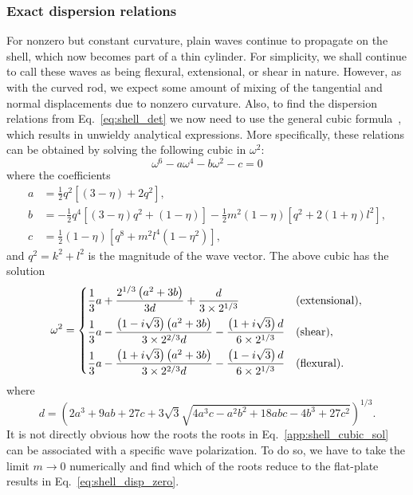 \subsubsection*{Exact dispersion relations}

For nonzero but constant curvature, plain waves continue to propagate on the shell, which now becomes part of a thin cylinder.
For simplicity, we shall continue to call these waves as being flexural, extensional, or shear in nature.
However, as with the curved rod, we expect some amount of mixing of the tangential and normal displacements due to nonzero curvature.
Also, to find the dispersion relations from Eq.~\eqref{eq:shell_det} we now need to use the general cubic formula~\cite{olver2010}, which results in unwieldy analytical expressions.
More specifically, these relations can be obtained by solving the following cubic in $\omega^{2}$:
%
\begin{equation}
  \omega^{6} - a\omega^{4} - b\omega^{2} - c = 0
\end{equation}
%
where the coefficients
%
\begin{equation}
  \begin{aligned}
    a &= \frac{1}{2}q^{2}\left[(3 - \eta) + 2q^{2}\right],\\
    b &= -\frac{1}{2}q^{4}\left[(3 - \eta)q^{2} + (1 - \eta)\right] - \frac{1}{2}m^{2}(1 - \eta)\left[q^{2} + 2(1 + \eta)l^{2}\right],\\
    c &= \frac{1}{2}(1-\eta)\left[q^{8} + m^{2}l^{4}\left(1 - \eta^{2}\right)\right],
  \end{aligned}
\end{equation}
%
and $q^{2} = k^{2} + l^{2}$ is the magnitude of the wave vector.
The above cubic has the solution
%
\begin{equation}
  \omega^{2} =
  \begin{dcases}
    \frac{1}{3}a + \frac{2^{1/3}\left(a^{2} + 3b\right)}{3d} + \frac{d}{3\times2^{1/3}} & \text{(extensional)},\\
    \frac{1}{3}a - \frac{\left(1 - i\sqrt{3}\right)\left(a^{2} + 3b\right)}{3\times2^{2/3}d} - \frac{\left(1 + i\sqrt{3}\right)d}{6\times2^{1/3}} & \text{(shear)},\\
    \frac{1}{3}a - \frac{\left(1 + i\sqrt{3}\right)\left(a^{2} + 3b\right)}{3\times2^{2/3}d} - \frac{\left(1 - i\sqrt{3}\right)d}{6\times2^{1/3}} & \text{(flexural)}.\\
  \end{dcases}
  \label{app:shell_cubic_sol}
\end{equation}
%
where
%
\begin{equation}
  d = \left(2 a^3+9 a b+27 c+3 \sqrt{3}\sqrt{4 a^3 c-a^2 b^2+18 a b c-4 b^3+27 c^2}\right)^{1/3}.
\end{equation}
%
It is not directly obvious how the roots the roots in Eq.~\eqref{app:shell_cubic_sol} can be associated with a specific wave polarization.
To do so, we have to take the limit $m \to 0$ numerically and find which of the roots reduce to the flat-plate results in Eq.~\eqref{eq:shell_disp_zero}.

